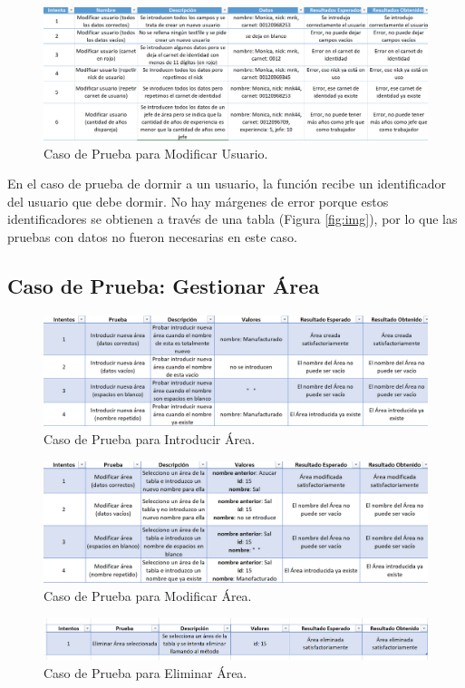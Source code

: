 \begin{figure}[h]
\centering
 \includegraphics[width=0.8\linewidth]{imagen/modificarU.png}
 \caption{Caso de Prueba para Modificar Usuario.}
 \label{fig:modificarU} 
\end{figure}

En el caso de prueba de dormir a un usuario, la función recibe un identificador del usuario que debe dormir. No hay márgenes de error porque estos identificadores se obtienen a través de una tabla (Figura \ref{fig:img}), por lo que las pruebas con datos no fueron necesarias en este caso.

\subsection{Caso de Prueba: Gestionar Área}
\begin{figure}[h]
\centering
 \includegraphics[width=0.8\linewidth]{imagen/introducirA.png}
 \caption{Caso de Prueba para Introducir Área.}
 \label{fig:introducirA} 
\end{figure}

\begin{figure}[h]
\centering
 \includegraphics[width=0.8\linewidth]{imagen/modificarA.png}
 \caption{Caso de Prueba para Modificar Área.}
 \label{fig:modificarA} 
\end{figure}

\begin{figure}[h]
\centering
 \includegraphics[width=0.8\linewidth]{imagen/eliminarA.png}
 \caption{Caso de Prueba para Eliminar Área.}
 \label{fig:eliminarA} 
\end{figure}

